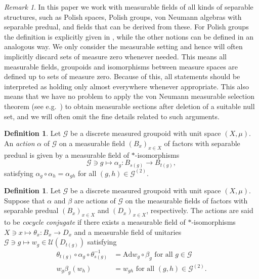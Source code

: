 \documentclass[11pt,a4paper]{article}
\theoremstyle{definition}
\newtheorem{definition}[theorem]{Definition}
\theoremstyle{remark}
\newtheorem{remark}[theorem]{Remark}
\numberwithin{equation}{section}
\numberwithin{theorem}{section}
\begin{document}
\begin{remark}
In this paper we work with measurable fields of all kinds of separable structures, such as Polish spaces, Polish groups, von Neumann algebras with separable predual, and fields that can be derived from these.
For Polish groups the definition is explicitly given in \cite{Sutherland85}, while the other notions can be defined in an analogous way.
We only consider the measurable setting and hence will often implicitly discard sets of measure zero whenever needed.
This means all measurable fields, groupoids and isomorphisms between measure spaces are defined up to sets of measure zero.
Because of this, all statements should be interpreted as holding only almost everywhere whenever appropriate.
This also means that we have no problem to apply the von Neumann measurable selection theorem (see e.g.\ \cite[Theorem 18.1]{Kechris95}) to obtain measurable sections after deletion of a suitable null set, and we will often omit the fine details related to such arguments.  
\end{remark}

\begin{definition}
Let $\mathcal{G}$ be a discrete measured groupoid with unit space $(X,\mu)$. An \emph{action} $\alpha$ of $\mathcal{G}$ on a measurable field $(B_x)_{x \in X}$ of factors with separable predual is given by a measurable field of $*$-isomorphisms \[\mathcal{G} \ni g \mapsto \alpha_g\colon B_{s(g)} \rightarrow B_{t(g)},\] 
satisfying $\alpha_g \circ \alpha_h = \alpha_{gh}$ for all $(g,h) \in \mathcal{G}^{(2)}$.
\end{definition}

\begin{definition}\label{def:cc_groupoid_actions}
Let $\mathcal{G}$ be a discrete measured groupoid with unit space $(X,\mu)$. Suppose that $\alpha$ and $\beta$ are actions of $\mathcal{G}$ on the measurable fields of factors with separable predual $(B_x)_{x \in X}$ and $(D_x)_{x \in X}$, respectively. The actions are said to be \emph{cocycle conjugate} if there exists a measurable field of $*$-isomorphisms $X \ni x \mapsto \theta_x\colon B_x \rightarrow D_x$ and a measurable field of unitaries $\mathcal{G} \ni g \mapsto w_g \in \mathcal{U}(D_{t(g)})$ satisfying  
\begin{align*}
\theta_{t(g)} \circ \alpha_g \circ \theta_{s(g)}^{-1} &= \mathrm{Ad} w_g \circ \beta_g \text{ for all } g \in \mathcal{G}\\
  w_g \beta_g(w_h) &= w_{gh} \text{ for all } (g,h) \in \mathcal{G}^{(2)}.
\end{align*}
\end{definition}
\end{document}
